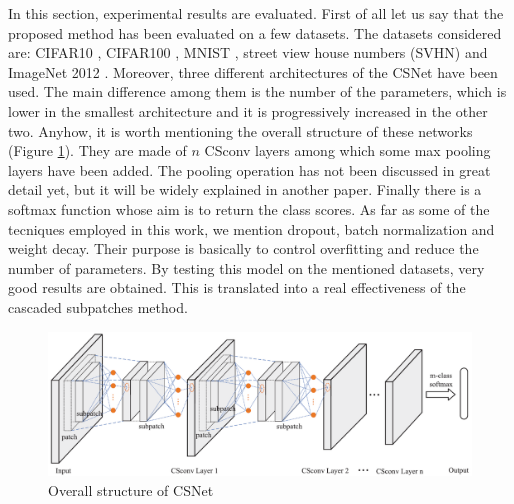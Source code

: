 In this section, experimental results are evaluated. First of all let us say that the proposed method has been evaluated on a few datasets. The datasets considered are: CIFAR10 \citep{CIFAR10and100}, CIFAR100 \citep{CIFAR10and100}, MNIST \citep{MNIST}, street view house numbers (SVHN) \citep{SVHN} and ImageNet 2012 \citep{ImageNet12}. Moreover, three different architectures of the CSNet have been used. The main difference among them is the number of the parameters, which is lower in the smallest architecture and it is progressively increased in the other two. Anyhow, it is worth mentioning the overall structure of these networks (Figure \ref{fig:01_3}). They are made of $n$ CSconv layers among which some max pooling layers have been added. The pooling operation has not been discussed in great detail yet, but it will be widely explained in another paper. Finally there is a softmax function whose aim is to return the class scores. As far as some of the tecniques employed in this work, we mention dropout, batch normalization and weight decay. Their purpose is basically to control overfitting and reduce the number of parameters. By testing this model on the mentioned datasets, very good results are obtained. This is translated into a real effectiveness of the cascaded subpatches method.\\

\begin{figure}[h!]
    \centering
    \includegraphics[scale=0.52]{images/01_3.png}
    \caption{Overall structure of CSNet}
    \label{fig:01_3}
\end{figure}

\FloatBarrier